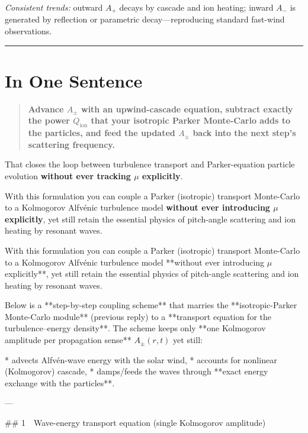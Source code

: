 \begin{tcolorbox}[colframe=black, colback=white, title=Step-by-Step Coupling Scheme]
\emph{Consistent trends:} outward \( A_+ \) decays by cascade and ion heating; inward \( A_- \) is generated by reflection or parametric decay—reproducing standard fast-wind observations.

\bigskip
\hrule
\bigskip

\section*{In One Sentence}

\begin{quote}
\textbf{Advance \( A_\pm \) with an upwind-cascade equation, subtract exactly the power \( Q_{\text{ion}} \) that your isotropic Parker Monte-Carlo adds to the particles, and feed the updated \( A_\pm \) back into the next step’s scattering frequency.}
\end{quote}

That closes the loop between turbulence transport and Parker-equation particle evolution \textbf{without ever tracking \( \mu \) explicitly}.

\end{tcolorbox}


With this formulation you can couple a Parker (isotropic) transport Monte-Carlo to a Kolmogorov Alfvénic turbulence model \textbf{without ever introducing \( \mu \) explicitly}, yet still retain the essential physics of pitch-angle scattering and ion heating by resonant waves.





With this formulation you can couple a Parker (isotropic) transport Monte-Carlo to a Kolmogorov Alfvénic turbulence model **without ever introducing $\mu$ explicitly**, yet still retain the essential physics of pitch-angle scattering and ion heating by resonant waves.


Below is a **step-by-step coupling scheme** that marries the **isotropic-Parker Monte-Carlo module** (previous reply) to a **transport equation for the turbulence–energy density**.  The scheme keeps only **one Kolmogorov amplitude per propagation sense** $A_\pm(r,t)$ yet still:

* advects Alfvén-wave energy with the solar wind,
* accounts for nonlinear (Kolmogorov) cascade,
* damps/feeds the waves through **exact energy exchange with the particles**.

---

## 1 Wave-energy transport equation (single Kolmogorov amplitude)

